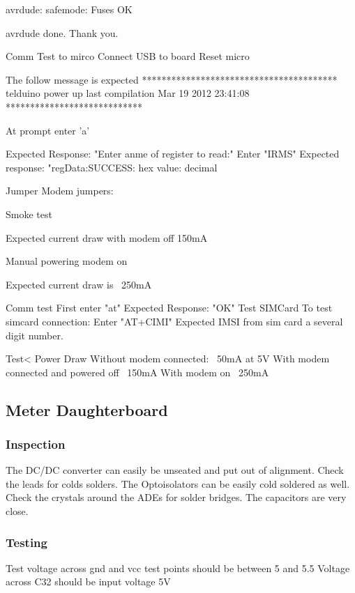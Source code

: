 \documentclass[]{article}
\begin{document}
avrdude: safemode: Fuses OK

avrdude done.  Thank you.


Comm Test to mirco
    Connect USB to board
    Reset micro

    The follow message is expected
        ****************************************
        telduino power up
        last compilation
        Mar 19 2012
        23:41:08
        ****************************

    At prompt enter 'a' 

    Expected Response: "Enter anme of register to read:"
    Enter "IRMS"
    Expected response: "regData:SUCCESS: hex value: decimal

Jumper Modem jumpers: 

Smoke test

    Expected current draw with modem off 150mA
    
Manual powering modem on

    Expected current draw is ~250mA

Comm test
First enter "at"
Expected Response: "OK"
Test SIMCard
    To test simcard connection:
    Enter "AT+CIMI"
    Expected IMSI from sim card a several digit number.


        Test< Power Draw
                Without modem connected: ~50mA at 5V
                With modem connected and powered off ~150mA
                With modem on ~250mA



    \subsection{Meter Daughterboard}


            
        \subsubsection{Inspection}
            The DC/DC converter can easily be unseated and put out of alignment. Check the leads for colds solders.
            The Optoisolators can be easily cold soldered as well.
            Check the crystals around the ADEs for solder bridges. The capacitors are very close.
        \subsubsection{Testing}
            Test voltage across gnd and vcc test points should be between 5 and 5.5
            Voltage across C32 should be input voltage 5V
\end{document}
